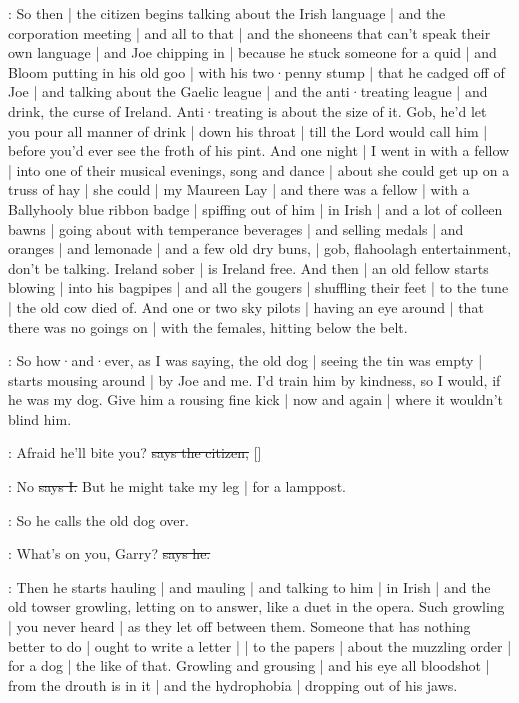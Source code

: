 \Nq:
So then |
the citizen begins talking about the Irish language |
and the corporation meeting
 |
and all to that |
and the shoneens that can't speak their own language |
and Joe chipping in |
because he stuck someone for a quid |
and Bloom putting in his old goo |
with his two·penny stump |
that he cadged off of Joe |
and talking about the Gaelic league |
and the anti·treating league |
and drink,
the curse of Ireland.
Anti·treating is about the size of it.
Gob,
he'd let you pour all manner of drink |
down his throat |
till the Lord would call him |
before you'd ever see the froth of his pint.
And one night |
I went in with a fellow |
into one of their musical evenings,
song and dance |
about she could get up on a truss of hay |
she could |
my Maureen Lay |
and there was a fellow |
with a Ballyhooly blue ribbon badge |
spiffing out of him |
in Irish |
and a lot of colleen bawns |
going about with temperance beverages
 |
and selling medals |
and oranges |
and lemonade |
and a few old dry buns, |
gob,
flahoolagh entertainment,
don't be talking.
Ireland sober |
is Ireland free.
And then |
an old fellow starts blowing |
into his bagpipes |
and all the gougers |
shuffling their feet |
to the tune |
the old cow died of.
And one or two sky pilots |
having an eye around |
that there was no goings on |
with the females,
hitting below the belt.

\Nq:
So how·and·ever,
as I was saying,
the old dog |
seeing the tin was empty |
starts mousing around |
by Joe and me.
I'd train him by kindness,
so I would,
if he was my dog.
Give him a rousing fine kick |
now and again |
where it wouldn't blind him.%

\citizen:
Afraid he'll bite you?
\sout{says the citizen,}
[]

:
No
\sout{says I.}
But he might take my leg |
for a lamppost.

\Nq:
So he calls the old dog over.

\citizen:
What's on you,
Garry?
\sout{says he.}

\Nq:
Then he starts hauling |
and mauling |
and talking to him |
in Irish |
and the old towser growling,
letting on to answer,
like a duet in the opera.
Such growling |
you never heard |
as they let off between them.
Someone that has nothing better to do |
ought to write a letter |
 |
to the papers |
about the muzzling order |
for a dog |
the like of that.
Growling and grousing |
and his eye all bloodshot |
from the drouth is in it
 |
and the hydrophobia |
dropping out of his jaws.

